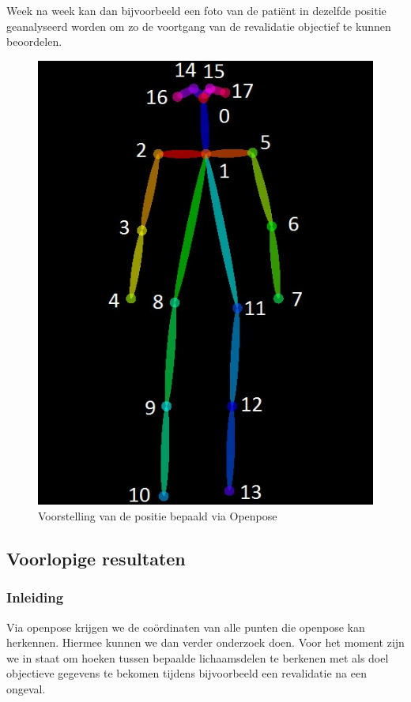 \documentclass{article}
\begin{document}
Week na week kan dan bijvoorbeeld een foto van de patiënt in dezelfde positie geanalyseerd worden om zo de voortgang van de revalidatie objectief te kunnen beoordelen. 

\begin{figure}[H]
	\centering
	\caption{Voorstelling van de positie bepaald via Openpose}
	\label{fig:skelet}
	\includegraphics[width=.5\textwidth]{HPE_skelet}
\end{figure}


	\subsection{Voorlopige resultaten}
\subsubsection*{Inleiding}
Via openpose krijgen we de coördinaten van alle punten die openpose kan herkennen. Hiermee kunnen we dan verder onderzoek doen. Voor het moment zijn we in staat om hoeken tussen bepaalde lichaamsdelen te berkenen met als doel objectieve gegevens te bekomen tijdens bijvoorbeeld een revalidatie na een ongeval.
\end{document}
